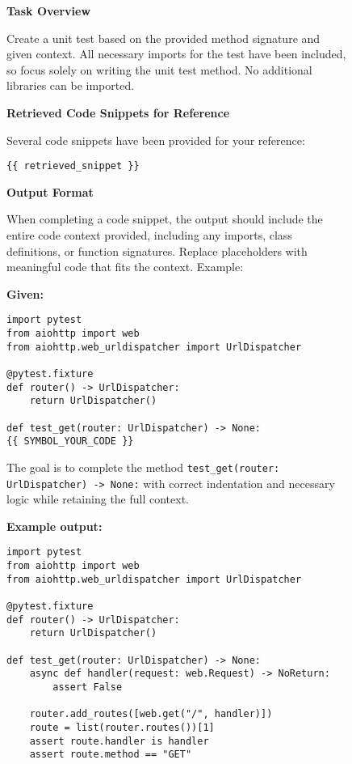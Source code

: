 \begin{figure}
    \centering
    \small

\begin{tcolorbox}[colback=blue!5!white, colframe=blue!75!black]

\textbf{Task Overview}

Create a unit test based on the provided method signature and given context. All necessary imports for the test have been included, so focus solely on writing the unit test method. No additional libraries can be imported.

\textbf{Retrieved Code Snippets for Reference}

Several code snippets have been provided for your reference:

\begin{verbatim}
{{ retrieved_snippet }}
\end{verbatim}

\textbf{Output Format}

When completing a code snippet, the output should include the entire code context provided, including any imports, class definitions, or function signatures. Replace placeholders with meaningful code that fits the context. Example:

\textbf{Given:}
\begin{verbatim}
import pytest
from aiohttp import web
from aiohttp.web_urldispatcher import UrlDispatcher

@pytest.fixture
def router() -> UrlDispatcher:
    return UrlDispatcher()

def test_get(router: UrlDispatcher) -> None:
{{ SYMBOL_YOUR_CODE }}
\end{verbatim}

The goal is to complete the method \texttt{test\_get(router: UrlDispatcher) -> None:} with correct indentation and necessary logic while retaining the full context.

\textbf{Example output:}
\begin{verbatim}
import pytest
from aiohttp import web
from aiohttp.web_urldispatcher import UrlDispatcher

@pytest.fixture
def router() -> UrlDispatcher:
    return UrlDispatcher()

def test_get(router: UrlDispatcher) -> None:
    async def handler(request: web.Request) -> NoReturn:
        assert False

    router.add_routes([web.get("/", handler)])
    route = list(router.routes())[1]
    assert route.handler is handler
    assert route.method == "GET"
\end{verbatim}


\end{tcolorbox}
\end{figure}
